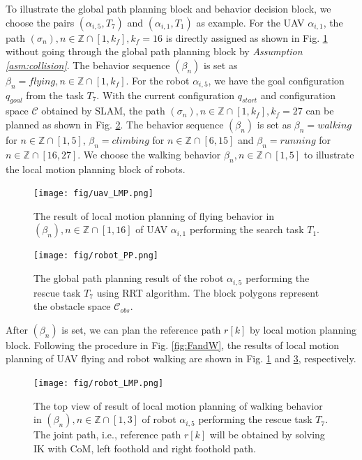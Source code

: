 \documentclass{ieeeaccess}
\begin{document}
To illustrate the global path planning block and behavior decision block, we choose the pairs $(\alpha_{i,5},T_7)$ and $(\alpha_{i,1}, T_1)$ as example. For the UAV $\alpha_{i,1}$, the path $(\sigma_n),n\in\mathbb{Z}\cap[1,k_f],k_f=16$ is directly assigned as shown in Fig. \ref{sim:flying} without going through the global path planning block by \textit{Assumption \ref{asm:collision}}. The behavior sequence $(\beta_n)$ is set as $\beta_n=\mathit{flying}, n\in\mathbb{Z}\cap[1,k_f]$. For the robot $\alpha_{i,5}$, we have the goal configuration $q_{goal}$ from the task $T_7$. With the current configuration $q_{start}$ and configuration space $\mathcal{C}$ obtained by SLAM, the path $(\sigma_n),n\in\mathbb{Z}\cap[1,k_f],k_f=27$ can be planned as shown in Fig. \ref{fig:R_task}. The behavior sequence $(\beta_n)$ is set as $\beta_n=\mathit{walking}$ for $n\in\mathbb{Z}\cap[1,5]$, $\beta_n=\mathit{climbing}$ for $n\in\mathbb{Z}\cap[6,15]$ and $\beta_n=\mathit{running}$ for $n\in\mathbb{Z}\cap[16,27]$. We choose the walking behavior $\beta_n, n\in\mathbb{Z}\cap[1,5]$ to illustrate the local motion planning block of robots.
\begin{figure}[htbp]
    \centering
    \texttt{[image: fig/uav\_LMP.png]}\caption{The result of local motion planning of flying behavior in $(\beta_n), n\in\mathbb{Z}\cap[1,16]$ of UAV $\alpha_{i,1}$ performing the search task $T_1$.}%
    \label{sim:flying}
\end{figure}
\begin{figure}[htbp]
    \centering
    \texttt{[image: fig/robot\_PP.png]}\caption{The global path planning result of the robot $\alpha_{i,5}$ performing the rescue task $T_7$ using RRT algorithm. The block polygons represent the obstacle space $\mathcal{C}_{obs}$.}%
    \label{fig:R_task}
\end{figure}

After $(\beta_n)$ is set, we can plan the reference path $r[k]$ by local motion planning block. Following the procedure in Fig. \ref{fig:FandW}, the results of local motion planning of UAV flying and robot walking are shown in Fig. \ref{sim:flying} and \ref{sim:walking}, respectively.
\begin{figure}[htbp]
    \centering
    \texttt{[image: fig/robot\_LMP.png]}\caption{The top view of result of local motion planning of walking behavior in $(\beta_n), n\in\mathbb{Z}\cap[1,3]$ of robot $\alpha_{i,5}$ performing the rescue task $T_7$. The joint path, i.e., reference path $r[k]$ will be obtained by solving IK with CoM, left foothold and right foothold path.}
    \label{sim:walking}
\end{figure}
\end{document}
